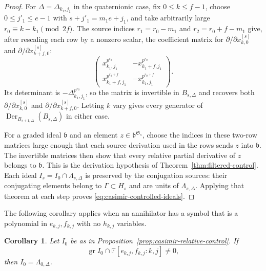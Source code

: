 \documentclass[11pt]{article}
\numberwithin{equation}{section}
\newtheorem{corollary}[theorem]{Corollary}
\theoremstyle{definition}
\theoremstyle{remark}
\newcommand{\F}{\mathbb F}
\DeclareMathOperator{\gr}{gr}
\DeclareMathOperator{\Der}{Der}
\begin{document}
\begin{proof}
For $\Delta=\Delta_{k_1,j_1}$ in the quaternionic case, fix
$0\leq k\leq f-1$, choose $0\leq j'_1\leq e-1$ with
$s+j'_1=m_1e+j_1$, and take arbitrarily large
$r_0\equiv k-k_1\pmod{2f}$. The source indices
$r_1=r_0-m_1$ and $r_2=r_0+f-m_1$ give, after rescaling
each row by a nonzero scalar, the coefficient matrix for
$\partial/\partial x_{k,0}^{[s]}$ and
$\partial/\partial x_{k+f,0}^{[s]}$:
\[
 \begin{pmatrix}
 x_{k_1,j_1}^{p^{r_0}}&-x_{k_1+f,j_1}^{p^{r_0}}\\
 x_{k_1+f,j_1}^{p^{r_0+f}}&-x_{k_1,j_1}^{p^{r_0+f}}
 \end{pmatrix}.
\]
Its determinant is $-\Delta_{k_1,j_1}^{p^{r_0}}$, so the matrix is
invertible in $B_{s,\Delta}$ and recovers both
$\partial/\partial x_{k,0}^{[s]}$ and
$\partial/\partial x_{k+f,0}^{[s]}$. Letting $k$ vary gives every
generator of $\Der_{B_{s+1,\Delta}}(B_{s,\Delta})$ in either case.

For a graded ideal $\mathfrak b$ and an element
$z\in\mathfrak b^{\mathfrak S_s}$, choose the indices in these
two-row matrices large enough that each source derivation used
in the rows sends $z$ into $\mathfrak b$. The invertible matrices then show that
every relative partial derivative of $z$ belongs to $\mathfrak b$.
This is the derivation hypothesis of Theorem~\ref{thm:filtered-control}.
Each ideal $I_s=I_0\cap\Lambda_{s,\Delta}$ is preserved by the conjugation
sources: their conjugating elements belong to $\Gamma\subset H_s$
and are units of $\Lambda_{s,\Delta}$. Applying that theorem at each step proves
\eqref{eq:casimir-controlled-ideals}.
\end{proof}

The following corollary applies when an annihilator has a symbol that is
a polynomial in $e_{k,j},f_{k,j}$ with no $h_{k,j}$ variables.

\begin{corollary}\label{cor:casimir-ef-extraction}
Let $I_0$ be as in Proposition~\ref{prop:casimir-relative-control}.
If
\[
 \gr I_0\cap\F[e_{k,j},f_{k,j}:k,j]\ne0,
\]
then $I_0=\Lambda_{0,\Delta}$.
\end{corollary}
\end{document}
